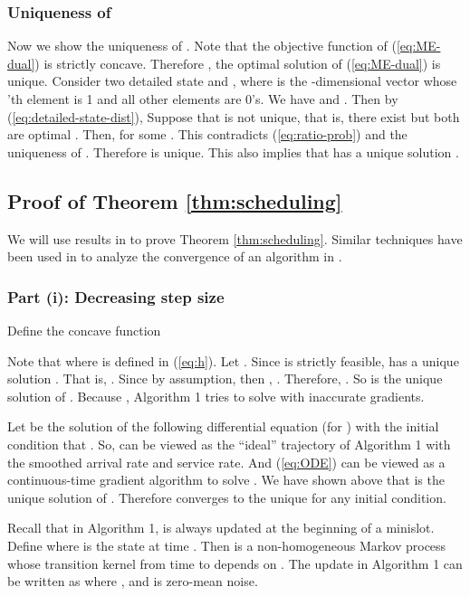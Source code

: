\documentclass{IEEEtran}
\begin{document}
\subsubsection{\label{sub:uniqueness}Uniqueness of }

Now we show the uniqueness of . Note that the objective
function of (\ref{eq:ME-dual}) is strictly concave. Therefore ,
the optimal solution of (\ref{eq:ME-dual}) is unique. Consider two
detailed state  and ,
where  is the -dimensional vector whose 'th
element is 1 and all other elements are 0's. We have 
and .
Then by (\ref{eq:detailed-state-dist}), 
Suppose that  is not unique, that is, there exist 
but both are optimal . Then, 
for some . This contradicts (\ref{eq:ratio-prob}) and the uniqueness
of . Therefore  is unique. This also implies
that  has a unique solution
.


\subsection{\label{sub:Proof-of-Theorem}Proof of Theorem \ref{thm:scheduling}}

We will use results in \cite{Borkar} to prove Theorem \ref{thm:scheduling}.
Similar techniques have been used in \cite{conv_MS} to analyze the
convergence of an algorithm in \cite{Allerton}.


\subsubsection{Part (i): Decreasing step size}

Define the concave function




Note that  where  is
defined in (\ref{eq:h}). Let .
Since  is strictly feasible, 
has a unique solution . That is, .
Since  by assumption, then ,
. Therefore,
.
So  is the unique solution of .
Because ,
Algorithm 1 tries to solve 
with inaccurate gradients. 

Let  be the solution of the following differential
equation (for ) 
with the initial condition that .
So,  can be viewed as the {}``ideal'' trajectory
of Algorithm 1 with the smoothed arrival rate and service rate. And
(\ref{eq:ODE}) can be viewed as a continuous-time gradient algorithm
to solve . We have shown
above that  is the unique solution of .
Therefore  converges to the unique 
for any initial condition.

Recall that in Algorithm 1,  is always updated at the
beginning of a minislot. Define  where
 is the state  at time . Then  is
a non-homogeneous Markov process whose transition kernel from time
 to  depends on . The update in Algorithm
1 can be written as
where ,
and  is zero-mean noise.
\end{document}
